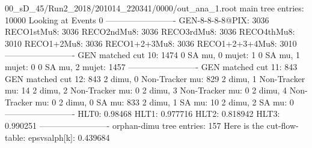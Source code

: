 00_sD_45/Run2_2018/201014_220341/0000/out_ana_1.root
main tree entries: 10000
Looking at Events 0
-------------------------
GEN-8-8-8-8@PIX: 3036
RECO1stMu8: 3036
RECO2ndMu8: 3036
RECO3rdMu8: 3036
RECO4thMu8: 3010
RECO1+2Mu8: 3036
RECO1+2+3Mu8: 3036
RECO1+2+3+4Mu8: 3010
-------------------------
GEN matched cut 10: 1474
0 SA mu, 0 mujet: 1
0 SA mu, 1 mujet: 0
0 SA mu, 2 mujet: 1457
-------------------------
GEN matched cut 11: 843
GEN matched cut 12: 843
2 dimu, 0 Non-Tracker mu: 829
2 dimu, 1 Non-Tracker mu: 14
2 dimu, 2 Non-Tracker mu: 0
2 dimu, 3 Non-Tracker mu: 0
2 dimu, 4 Non-Tracker mu: 0
2 dimu, 0 SA mu: 833
2 dimu, 1 SA mu: 10
2 dimu, 2 SA mu: 0
-------------------------
HLT0: 0.98468
HLT1: 0.977716
HLT2: 0.818942
HLT3: 0.990251
-------------------------
orphan-dimu tree entries: 157
Here is the cut-flow-table:
epsvsalph[k]: 0.439684
        
